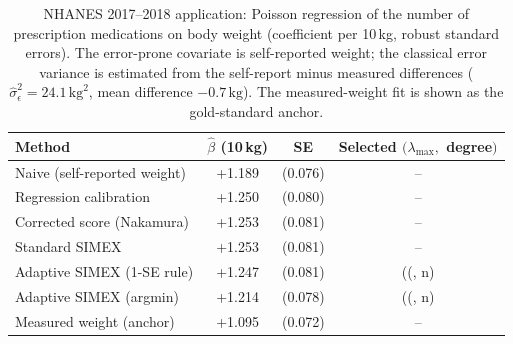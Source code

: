 \begin{table}[t]
\centering
\small
\caption{NHANES 2017--2018 application: Poisson regression of the
number of prescription medications on body weight (coefficient per
10\,kg, robust standard errors). The error-prone covariate is
self-reported weight; the classical error variance is estimated
from the self-report minus measured differences
($\hat\sigma^2_\epsilon = 24.1\,\mathrm{kg}^2$,
mean difference $-0.7\,\mathrm{kg}$). The
measured-weight fit is shown as the gold-standard anchor.}
\label{tab:nhanes}
\begin{tabular}{lccc}
\toprule
Method & $\hat\beta$ (10\,kg) & SE & Selected $(\lambda_{\max},$ degree$)$ \\
\midrule
Naive (self-reported weight) & +1.189 & (0.076) & -- \\
Regression calibration & +1.250 & (0.080) & -- \\
Corrected score (Nakamura) & +1.253 & (0.081) & -- \\
Standard SIMEX & +1.253 & (0.081) & -- \\
Adaptive SIMEX (1-SE rule) & +1.247 & (0.081) & ((, n) \\
Adaptive SIMEX (argmin) & +1.214 & (0.078) & ((, n) \\
Measured weight (anchor) & +1.095 & (0.072) & -- \\
\bottomrule
\end{tabular}
\end{table}